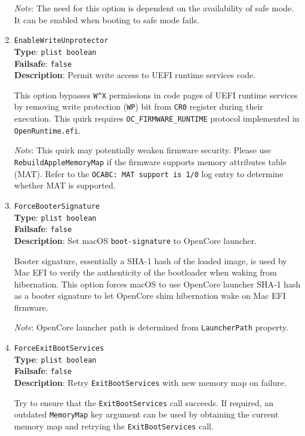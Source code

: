 \documentclass[]{article}
\begin{document}
\begin{enumerate}
  \emph{Note}: The need for this option is dependent on the availability of safe mode.
  It can be enabled when booting to safe mode fails.

\item
  \texttt{EnableWriteUnprotector}\\
  \textbf{Type}: \texttt{plist\ boolean}\\
  \textbf{Failsafe}: \texttt{false}\\
  \textbf{Description}: Permit write access to UEFI runtime services code.

  This option bypasses \texttt{W\^{}X} permissions in code pages of UEFI runtime
  services by removing write protection (\texttt{WP}) bit from \texttt{CR0}
  register during their execution. This quirk requires \texttt{OC\_FIRMWARE\_RUNTIME}
  protocol implemented in \texttt{OpenRuntime.efi}.

  \emph{Note}: This quirk may potentially weaken firmware security. Please use
  \texttt{RebuildAppleMemoryMap} if the firmware supports memory attributes table (MAT).
  Refer to the \texttt{OCABC: MAT support is 1/0} log entry to determine whether MAT is supported.

\item
  \texttt{ForceBooterSignature}\\
  \textbf{Type}: \texttt{plist\ boolean}\\
  \textbf{Failsafe}: \texttt{false}\\
  \textbf{Description}: Set macOS \texttt{boot-signature} to OpenCore launcher.

  Booter signature, essentially a SHA-1 hash of the loaded image, is used by Mac EFI
  to verify the authenticity of the bootloader when waking from hibernation. This
  option forces macOS to use OpenCore launcher SHA-1 hash as a booter signature to let
  OpenCore shim hibernation wake on Mac EFI firmware.

  \emph{Note}: OpenCore launcher path is determined from \texttt{LauncherPath} property.

\item
  \texttt{ForceExitBootServices}\\
  \textbf{Type}: \texttt{plist\ boolean}\\
  \textbf{Failsafe}: \texttt{false}\\
  \textbf{Description}: Retry \texttt{ExitBootServices} with new memory map on failure.

  Try to ensure that the \texttt{ExitBootServices} call succeeds. If required, an
  outdated \texttt{MemoryMap} key argument can be used by obtaining the current
  memory map and retrying the \texttt{ExitBootServices} call.


\end{enumerate}
\end{document}
